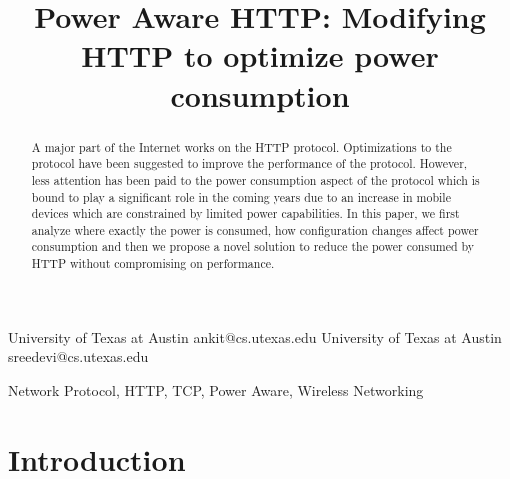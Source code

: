 \documentclass{sigplanconf}
\begin{document}
\setlength{\pdfpageheight}{\paperheight}
\setlength{\pdfpagewidth}{\paperwidth}






\title{Power Aware HTTP: Modifying HTTP to optimize power consumption}


{University of Texas at Austin}
           {ankit@cs.utexas.edu}
{University of Texas at Austin}
           {sreedevi@cs.utexas.edu}

\maketitle

\begin{abstract}
\noindent A major part of the Internet works on the HTTP protocol. Optimizations to the protocol have been suggested to improve the performance of the protocol. However, less attention has been paid to the power consumption aspect of the protocol which is bound to play a significant role in the coming years due to an increase in mobile devices which are constrained by limited power capabilities. In this paper, we first analyze where exactly the power is consumed, how configuration changes affect power consumption and then we propose a novel solution to reduce the power consumed by HTTP without compromising on performance. 

\end{abstract}


\keywords
Network Protocol, HTTP, TCP, Power Aware, Wireless Networking

\section{Introduction}
\end{document}
